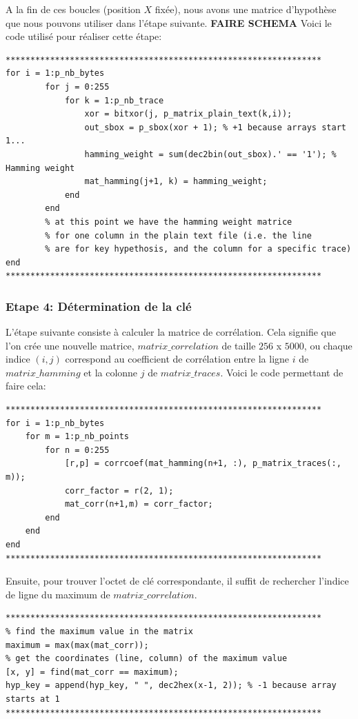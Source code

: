 \documentclass[a4paper, 12pt]{article}
\begin{document}
A la fin de ces boucles (position $X$ fixée), nous avons une matrice d'hypothèse que nous pouvons utiliser dans l'étape suivante. 
\textbf{FAIRE SCHEMA}
Voici le code utilisé pour réaliser cette étape:
\begin{lstlisting}
****************************************************************
for i = 1:p_nb_bytes
        for j = 0:255
            for k = 1:p_nb_trace 
                xor = bitxor(j, p_matrix_plain_text(k,i));
                out_sbox = p_sbox(xor + 1); % +1 because arrays start 1...
                hamming_weight = sum(dec2bin(out_sbox).' == '1'); % Hamming weight
                mat_hamming(j+1, k) = hamming_weight;
            end
        end 
        % at this point we have the hamming weight matrice 
        % for one column in the plain text file (i.e. the line 
        % are for key hypethosis, and the column for a specific trace)
end
****************************************************************
\end{lstlisting}

			\subsubsection{Etape 4: Détermination de la clé}
		L'étape suivante consiste à calculer la matrice de corrélation. Cela signifie que l'on crée une nouvelle matrice, $matrix\_correlation$ de taille $256$ x $5000$, ou chaque indice $(i, j)$ correspond au coefficient de corrélation entre la ligne $i$ de $matrix\_hamming$ et la colonne $j$ de $matrix\_traces$.
Voici le code permettant de faire cela:
\begin{lstlisting}
****************************************************************
for i = 1:p_nb_bytes
	for m = 1:p_nb_points
    	for n = 0:255
        	[r,p] = corrcoef(mat_hamming(n+1, :), p_matrix_traces(:, m));
            corr_factor = r(2, 1);
            mat_corr(n+1,m) = corr_factor;
        end
    end
end
****************************************************************
\end{lstlisting}


Ensuite, pour trouver l'octet de clé correspondante, il suffit de rechercher l'indice de ligne du maximum de $matrix\_correlation$. 
\begin{lstlisting}
****************************************************************
% find the maximum value in the matrix
maximum = max(max(mat_corr)); 
% get the coordinates (line, column) of the maximum value
[x, y] = find(mat_corr == maximum); 
hyp_key = append(hyp_key, " ", dec2hex(x-1, 2)); % -1 because array starts at 1
****************************************************************
\end{lstlisting}
\end{document}

